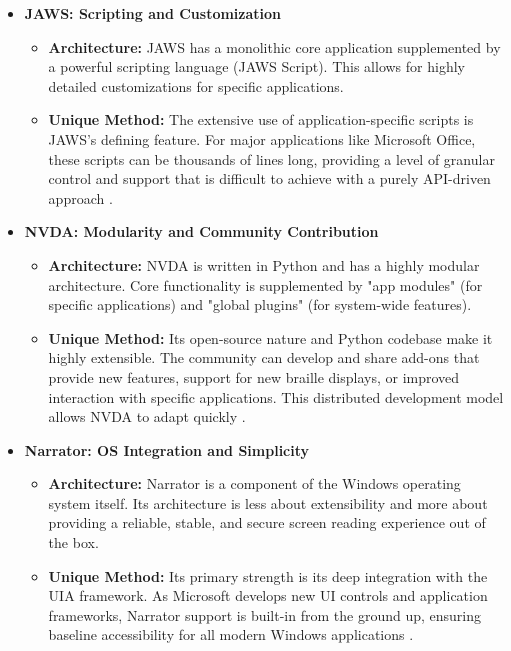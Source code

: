 \begin{itemize}
	\item \textbf{JAWS: Scripting and Customization}
	      \begin{itemize}
		      \item \textbf{Architecture:} JAWS has a monolithic core application supplemented by a powerful scripting language (JAWS Script). This allows for highly detailed customizations for specific applications.
		      \item \textbf{Unique Method:} The extensive use of application-specific scripts is JAWS's defining feature. For major applications like Microsoft Office, these scripts can be thousands of lines long, providing a level of granular control and support that is difficult to achieve with a purely API-driven approach \cite{JAWSScripting}.
	      \end{itemize}
	\item \textbf{NVDA: Modularity and Community Contribution}
	      \begin{itemize}
		      \item \textbf{Architecture:} NVDA is written in Python and has a highly modular architecture. Core functionality is supplemented by "app modules" (for specific applications) and "global plugins" (for system-wide features).
		      \item \textbf{Unique Method:} Its open-source nature and Python codebase make it highly extensible. The community can develop and share add-ons that provide new features, support for new braille displays, or improved interaction with specific applications. This distributed development model allows NVDA to adapt quickly \cite{NVAccess}.
	      \end{itemize}
	\item \textbf{Narrator: OS Integration and Simplicity}
	      \begin{itemize}
		      \item \textbf{Architecture:} Narrator is a component of the Windows operating system itself. Its architecture is less about extensibility and more about providing a reliable, stable, and secure screen reading experience out of the box.
		      \item \textbf{Unique Method:} Its primary strength is its deep integration with the UIA framework. As Microsoft develops new UI controls and application frameworks, Narrator support is built-in from the ground up, ensuring baseline accessibility for all modern Windows applications \cite{NarratorTechDetails}.
	      \end{itemize}
\end{itemize}

